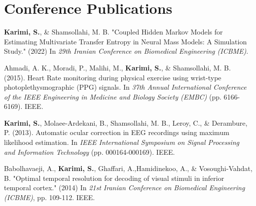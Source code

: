 \documentclass[
	10pt, %
]{FreemanCV}
\begin{document}
\begin{paracol}{2}
\begin{supertabular}{r l}
	
	
\end{supertabular}

\medskip %




\section{Conference Publications}


\textbf{Karimi, S.}, \& Shamsollahi, M. B. "Coupled Hidden Markov Models for Estimating Multivariate Transfer Entropy in Neural Mass Models: A Simulation Study." (2022) In \textit{29th Iranian Conference on Biomedical Engineering (ICBME)}.
\medskip %

Ahmadi, A. K., Moradi, P., Malihi, M., \textbf{Karimi, S.}, \& Shamsollahi, M. B. (2015). Heart Rate monitoring during physical exercise using wrist-type photoplethysmographic (PPG) signals. In \textit{37th Annual International Conference of the IEEE Engineering in Medicine and Biology Society (EMBC)} (pp. 6166-6169). IEEE.
\medskip %


\textbf{Karimi, S.}, Molaee-Ardekani, B., Shamsollahi, M. B., Leroy, C., \& Derambure, P. (2013). Automatic ocular correction in EEG recordings using maximum likelihood estimation. In  \textit{IEEE International Symposium on Signal Processing and Information Technology} (pp. 000164-000169). IEEE.
\medskip %

Babolhavaeji, A., \textbf{Karimi, S.}, Ghaffari, A.,Hamidinekoo, A., \& Vosoughi-Vahdat, B. "Optimal temporal resolution for decoding of visual stimuli in inferior temporal cortex." (2014) In \textit{21st Iranian Conference on Biomedical Engineering (ICBME)}, pp. 109-112. IEEE.
\medskip %


\medskip %


\end{paracol} %

\end{document}
